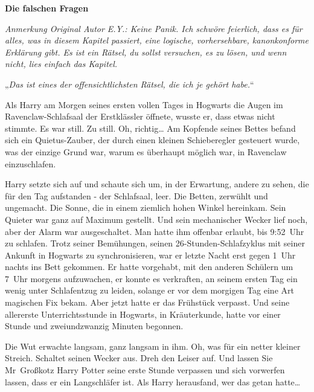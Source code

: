 

\hypertarget{die-falschen-fragen}{%

\textbf{Die falschen Fragen}

\emph{Anmerkung Original Autor E.Y.: Keine Panik. Ich schwöre feierlich, dass es für alles, was in diesem Kapitel passiert, eine logische, vorhersehbare, kanonkonforme Erklärung gibt. Es ist ein Rätsel, du sollst versuchen, es zu lösen, und wenn nicht, lies einfach das Kapitel.}

„\emph{Das ist eines der offensichtlichsten Rätsel, die ich je gehört habe.}“

Als Harry am Morgen seines ersten vollen Tages in Hogwarts die Augen im Ravenclaw-Schlafsaal der Erstklässler öffnete, wusste er, dass etwas nicht stimmte. Es war still. Zu still. Oh, richtig… Am Kopfende seines Bettes befand sich ein Quietus-Zauber, der durch einen kleinen Schieberegler gesteuert wurde, was der einzige Grund war, warum es überhaupt möglich war, in Ravenclaw einzuschlafen.

Harry setzte sich auf und schaute sich um, in der Erwartung, andere zu sehen, die für den Tag aufstanden - der Schlafsaal, leer. Die Betten, zerwühlt und ungemacht. Die Sonne, die in einem ziemlich hohen Winkel hereinkam. Sein Quieter war ganz auf Maximum gestellt. Und sein mechanischer Wecker lief noch, aber der Alarm war ausgeschaltet. Man hatte ihm offenbar erlaubt, bis 9:52~Uhr zu schlafen. Trotz seiner Bemühungen, seinen 26-Stunden-Schlafzyklus mit seiner Ankunft in Hogwarts zu synchronisieren, war er letzte Nacht erst gegen 1~Uhr nachts ins Bett gekommen. Er hatte vorgehabt, mit den anderen Schülern um 7~Uhr morgens aufzuwachen, er konnte es verkraften, an seinem ersten Tag ein wenig unter Schlafentzug zu leiden, solange er vor dem morgigen Tag eine Art magischen Fix bekam. Aber jetzt hatte er das Frühstück verpasst. Und seine allererste Unterrichtsstunde in Hogwarts, in Kräuterkunde, hatte vor einer Stunde und zweiundzwanzig Minuten begonnen.

Die Wut erwachte langsam, ganz langsam in ihm. Oh, was für ein netter kleiner Streich. Schaltet seinen Wecker aus. Dreh den Leiser auf. Und lassen Sie Mr~Großkotz Harry Potter seine erste Stunde verpassen und sich vorwerfen lassen, dass er ein Langschläfer ist. Als Harry herausfand, wer das getan hatte…

}
